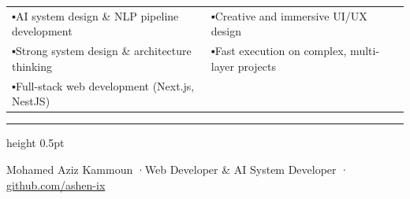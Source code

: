 \documentclass[10pt, a4paper]{article}
\begin{document}
\begin{tabularx}{\textwidth}{@{} X X @{}}
  \textcolor{accent}{▪}\enspace AI system design \& NLP pipeline development &
  \textcolor{accent}{▪}\enspace Creative and immersive UI/UX design \\[2pt]
  \textcolor{accent}{▪}\enspace Strong system design \& architecture thinking &
  \textcolor{accent}{▪}\enspace Fast execution on complex, multi-layer projects \\[2pt]
  \textcolor{accent}{▪}\enspace Full-stack web development (Next.js, NestJS) &

\end{tabularx}

\vspace{6pt}
{\color{rule}\hrule height 0.5pt}
\vspace{3pt}
\begin{center}
  {\footnotesize\color{muted}
    Mohamed Aziz Kammoun \enspace·\enspace Web Developer \& AI System Developer \enspace·\enspace
    \href{https://github.com/ashen-ix}{github.com/ashen-ix}
  }
\end{center}
\end{document}
